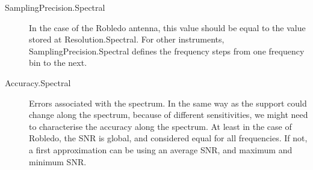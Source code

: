 \begin{description}
				 \item[SamplingPrecision.Spectral] In the case of
				the Robledo antenna, this value should be equal to
				the value stored at Resolution.Spectral. For other
				instruments, SamplingPrecision.Spectral defines the
				frequency steps from one frequency bin to the next.
				
				 \item[Accuracy.Spectral] Errors associated with
				the spectrum. In the same way as the support could
				change along the spectrum, because of different
				sensitivities, we might need to characterise the
				accuracy along the spectrum. At least in the case
				of Robledo, the SNR is global, and considered equal
				for all frequencies. If not, a first approximation
				can be using an average SNR, and maximum and
				minimum SNR.
			\end{description}
			
